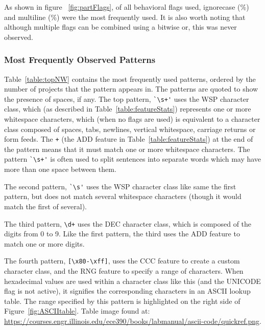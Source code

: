  As shown in figure ~\ref{fig:partFlags}, of all behavioral flags used, ignorecase (\%) and multiline (\%) were the most frequently used.  It is also worth noting that although multiple flags can be combined using a bitwise or, this was never observed.


\subsubsection{Most Frequently Observed Patterns}

Table~\ref{table:topNW} contains the most frequently used patterns, ordered by the number of projects that the pattern appears in.  The patterns are quoted to show the presence of spaces, if any.  The top pattern, \verb!`\s+'! uses the WSP character class, which (as described in Table~\ref{table:featureStats}) represents one or more whitespace characters, which (when no flags are used) is equivalent to a character class composed of spaces, tabs, newlines, vertical whitespace, carriage returns or form feeds.  The \verb!+! (the ADD feature in Table~\ref{table:featureStats}) at the end of the pattern means that it must match one or more whitespace characters.  The pattern \verb!`\s+'! is often used to split sentences into separate words which may have more than one space between them.

The second pattern, \verb!`\s'! uses the WSP character class like same the first pattern, but does not match several whitespace characters (though it would match the first of several).

The third pattern, \verb!\d+! uses the DEC character class, which is composed of the digits from 0 to 9.  Like the first pattern, the third uses the ADD feature to match one or more digits.

The fourth pattern, \verb![\x80-\xff]!, uses the CCC feature to create a custom character class, and the RNG feature to specify a range of characters.
When hexadecimal values are used within a character class like this (and the UNICODE flag is not active), it signifies the corresponding characters in an ASCII lookup table.  The range specified by this pattern is highlighted on the right side of Figure~\ref{fig:ASCIItable}.  Table image found at: \url{https://courses.engr.illinois.edu/ece390/books/labmanual/ascii-code/quickref.png}.

